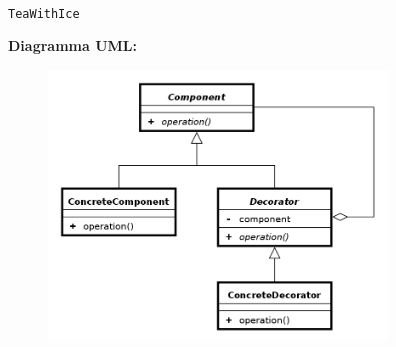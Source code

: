 \begin{solution}
\begin{itemize}
\\
\texttt{TeaWithIce}
\end{itemize}
\textbf{Diagramma UML:}
\begin{figure}[htb!]
	\centering
	\includegraphics[width=9cm]{./immagini/decoratorPattern.png}
\end{figure}
\end{solution}

